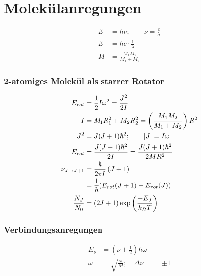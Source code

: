 \section{Molekülanregungen}


\begin{equation*}
    \begin{aligned}
        E &= h \nu; \qquad \nu = \frac{c}{\lambda} \\
        E &= hc \cdot \frac{1}{\lambda} \\
        M &= \frac{M_1 M_2}{M_1 + M_2}
    \end{aligned}
\end{equation*}

\subsubsection*{2-atomiges Molekül als starrer Rotator}

\begin{equation*}
    \begin{aligned}
        E_{rot} &= \frac{1}{2} I \omega^2 = \frac{J^2}{2 I} \\
        I &= M_1R_1^2 + M_2R_2^2 = \left(\frac{M_1M_2}{M_1 + M_2}\right) R^2 \\
        J^2 &= J(J+1) \hbar^2 ; \qquad \left\vert J\right\vert = I\omega \\
        E_{rot} &= \frac{J(J+1)\hbar^2}{2I} = \frac{J(J+1)\hbar^2}{2MR^2}\\
        \nu_{J \rightarrow J+1} &= \frac{\hbar}{2 \pi I} \left(J+1\right) \\
        &= \frac{1}{h} (E_{rot}(J+1) - E_{rot}(J)) \\
        \frac{N_J}{N_0} &= \left(2J+1\right) \exp \left(\frac{-E_J}{k_BT}\right)
    \end{aligned}
\end{equation*}

\subsubsection*{Verbindungsanregungen}

\begin{equation*}
    \begin{aligned}
        E_\nu &= \left(\nu + \frac{1}{2}\right) \hbar \omega \\
        \omega &= \sqrt{\frac{\omega}{M}}; \quad \Delta \nu &= \pm 1 \\
    \end{aligned}
\end{equation*}

